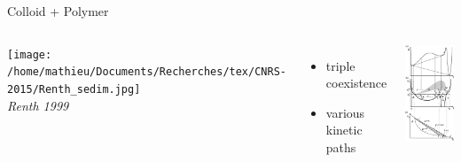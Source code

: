 \documentclass[xcolor=table]{beamer}
\begin{document}
\begin{frame}{Colloid + Polymer}
\begin{columns}

	\bigskip
	\texttt{[image: /home/mathieu/Documents/Recherches/tex/CNRS-2015/Renth\_sedim.jpg]}\\
	\textit{\footnotesize Renth 1999}
	\begin{itemize}
	\item triple coexistence
	\item various kinetic paths
	\end{itemize}

	\includegraphics[width=\textwidth,clip=true,trim=0 0 0 4.5cm]{Renth_diag.pdf}
	\end{columns}
\end{frame}
\end{document}
